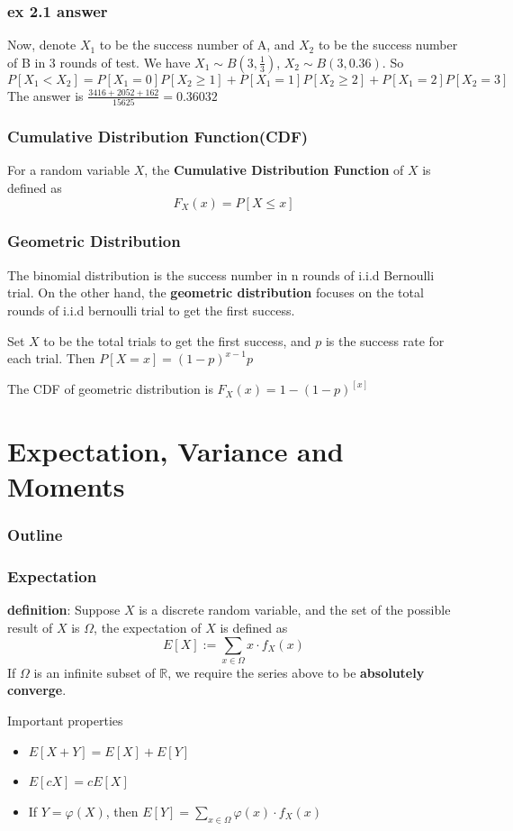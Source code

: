 \documentclass{beamer}
\begin{document}
\begin{frame}
    \frametitle{ex 2.1 answer}
    Now, denote $X_1$ to be the success number of A, and $X_2$ to be the success number of B in 3 rounds of test. We have $X_1\sim B(3,\frac{1}{3})$, $X_2\sim B(3,0.36)$. So
    \small
    \[P[X_1<X_2]=P[X_1=0]P[X_2\geq 1]+P[X_1=1]P[X_2\geq 2]+P[X_1=2]P[X_2=3]\]
    The answer is $\frac{3416+2052+162}{15625}=0.36032$
\end{frame}

\begin{frame}
    \frametitle{Cumulative Distribution Function(CDF)}
    For a random variable $X$, the \textbf{Cumulative Distribution Function} of $X$ is defined as 
    \[F_X(x)=P[X\leq x]\]
    
\end{frame}


\begin{frame}
    \frametitle{Geometric Distribution}
    The binomial distribution is the success number in n rounds of i.i.d Bernoulli trial. On the other hand, the \textbf{geometric distribution} focuses on the total rounds of i.i.d bernoulli trial to get the first success.\par
    \vspace{0.3cm}
    Set $X$ to be the total trials to get the first success, and $p$ is the success rate for each trial. Then $P[X=x]=(1-p)^{x-1}p$\par
    The CDF of geometric distribution is $F_X(x)=1-(1-p)^{[x]}$

\end{frame}

\section{Expectation, Variance and Moments}

\begin{frame}
    \frametitle{Outline}
    \tableofcontents[currentsection]
\end{frame}
\begin{frame}
    \frametitle{Expectation}
    \textbf{definition}: Suppose $X$ is a discrete random variable, and the set of the possible result of $X$ is $\varOmega$, the expectation of $X$ is defined as
    \[E[X]:=\sum\limits_{x\in \varOmega}x\cdot f_X(x)\]
    If $\varOmega$ is an infinite subset of $\mathbb{R}$, we require the series above to be \textbf{absolutely converge}.\par
    \vspace{0.3cm}
    Important properties
    \begin{itemize}
        \item $E[X+Y]=E[X]+E[Y]$
        \item $E[cX]=cE[X]$
        \item If $Y=\varphi(X)$, then $E[Y]=\sum\limits_{x\in \varOmega}\varphi(x)\cdot f_X(x)$
    \end{itemize}
    
\end{frame}
\end{document}
